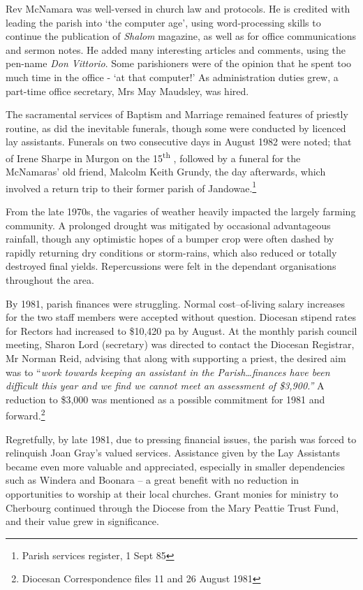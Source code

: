 Rev McNamara was well-versed in church law and protocols. He is credited with leading the parish into `the computer age', using word-processing skills to continue the publication of \emph{Shalom} magazine, as well as for office communications and sermon notes. He added many interesting articles and comments, using the pen-name \emph{Don Vittorio}. Some parishioners were of the opinion that he spent too much time in the office - `at that computer!' As administration duties grew, a part-time office secretary, Mrs May Maudsley, was hired.



The sacramental services of Baptism and Marriage remained features of priestly routine, as did the inevitable funerals, though some were conducted by licenced lay assistants. Funerals on two consecutive days in August 1982 were noted; that of Irene Sharpe in Murgon on the 15\textsuperscript{th} , followed by a funeral for the McNamaras' old friend, Malcolm Keith Grundy, the day afterwards, which involved a return trip to their former parish of Jandowae.\footnote{Parish services register, 1 Sept 85}


From the late 1970s, the vagaries of weather heavily impacted the largely farming community. A prolonged drought was mitigated by occasional advantageous rainfall, though any optimistic hopes of a bumper crop were often dashed by rapidly returning dry conditions or storm-rains, which also reduced or totally destroyed final yields. Repercussions were felt in the dependant organisations throughout the area.



By 1981, parish finances were struggling. Normal cost--of-living salary increases for the two staff members were accepted without question. Diocesan stipend rates for Rectors had increased to \$10,420 pa by August. At the monthly parish council meeting, Sharon Lord (secretary) was directed to contact the Diocesan Registrar, Mr Norman Reid, advising that along with supporting a priest, the desired aim was to ``\emph{work towards keeping an assistant in the Parish\ldots finances have been difficult this year and we find we cannot meet an assessment of \$3,900.''} A reduction to \$3,000 was mentioned as a possible commitment for 1981 and forward.\footnote{Diocesan Correspondence files 11 and 26 August 1981}


Regretfully, by late 1981, due to pressing financial issues, the parish was forced to relinquish Joan Gray's valued services. Assistance given by the Lay Assistants became even more valuable and appreciated, especially in smaller dependencies such as Windera and Boonara -- a great benefit with no reduction in opportunities to worship at their local churches. Grant monies for ministry to Cherbourg continued through the Diocese from the Mary Peattie Trust Fund, and their value grew in significance.



